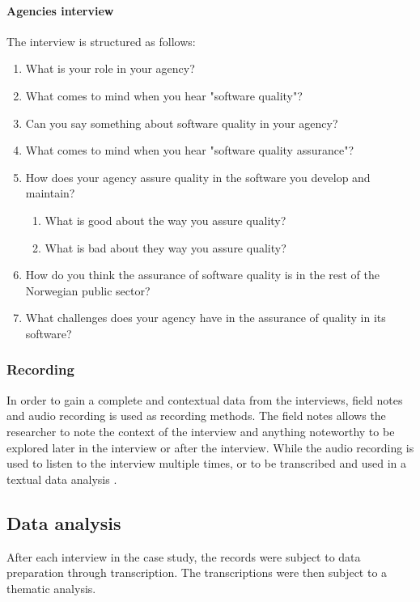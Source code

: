 \paragraph{Agencies interview}
The interview is structured as follows:

\begin{enumerate}
    \item What is your role in your agency?
    \item What comes to mind when you hear "software quality"?
    \item Can you say something about software quality in your agency?
    \item What comes to mind when you hear "software quality assurance"?
    \item How does your agency assure quality in the software you develop and maintain?
    \begin{enumerate}
        \item What is good about the way you assure quality?
        \item What is bad about they way you assure quality?
    \end{enumerate}
    \item How do you think the assurance of software quality is in the rest of the Norwegian public sector?
    \item What challenges does your agency have in the assurance of quality in its software?
\end{enumerate}

\subsubsection{Recording}
In order to gain a complete and contextual data from the interviews, field notes and audio recording is used as recording methods. The field notes allows the researcher to note the context of the interview and anything noteworthy to be explored later in the interview or after the interview. While the audio recording is used to listen to the interview multiple times, or to be transcribed and used in a textual data analysis \cite{bjo_2022}.


\subsection{Data analysis}
After each interview in the case study, the records were subject to data preparation through transcription. The transcriptions were then subject to a thematic analysis.

